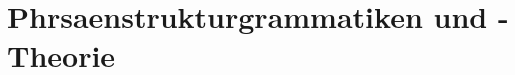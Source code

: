 
\subtitle{Phrsaenstrukturgrammatiken und \xbar-Theorie}

\section{Phrsaenstrukturgrammatiken und \xbar-Theorie}


\huberlintitlepage[22pt]

